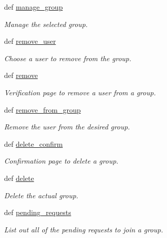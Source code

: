 \begin{DoxyCompactItemize}
def \hyperlink{namespaceusers__old_1_1views_aee85f99cc110af98f3e7e0e7eb1c3570}{manage\_\-group}
\begin{DoxyCompactList}\small\item\em Manage the selected group. \item\end{DoxyCompactList}\item 
def \hyperlink{namespaceusers__old_1_1views_acbbdd835fb0ec6b3b554c9d3423d062f}{remove\_\-user}
\begin{DoxyCompactList}\small\item\em Choose a user to remove from the group. \item\end{DoxyCompactList}\item 
def \hyperlink{namespaceusers__old_1_1views_a84c2e651524e305ce1792520fc08c6b2}{remove}
\begin{DoxyCompactList}\small\item\em Verification page to remove a user from a group. \item\end{DoxyCompactList}\item 
def \hyperlink{namespaceusers__old_1_1views_a7776f02a7976e4dfdc09e04a10dac96e}{remove\_\-from\_\-group}
\begin{DoxyCompactList}\small\item\em Remove the user from the desired group. \item\end{DoxyCompactList}\item 
def \hyperlink{namespaceusers__old_1_1views_a37152578db6349f34e99dc2aeb81eb05}{delete\_\-confirm}
\begin{DoxyCompactList}\small\item\em Confirmation page to delete a group. \item\end{DoxyCompactList}\item 
def \hyperlink{namespaceusers__old_1_1views_a10b04a5e1fa87a5718d9cabd0d3aab53}{delete}
\begin{DoxyCompactList}\small\item\em Delete the actual group. \item\end{DoxyCompactList}\item 
def \hyperlink{namespaceusers__old_1_1views_af36c203d4d8142380b4839875d6dea8d}{pending\_\-requests}
\begin{DoxyCompactList}\small\item\em List out all of the pending requests to join a group. \item\end{DoxyCompactList}\item 

\end{DoxyCompactItemize}
